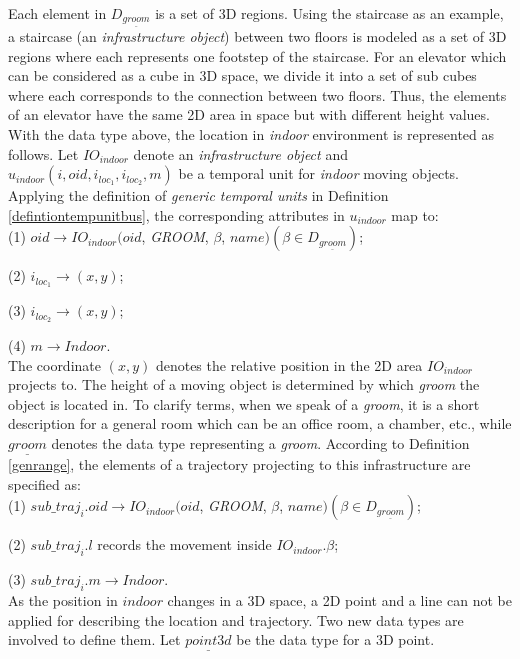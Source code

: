 Each element in $D_{\underline{groom}}$ is a set of 3D regions. 
Using the staircase as an example, a staircase (an \textit{infrastructure object}) between two 
floors is modeled as a set of 3D regions where 
each represents one footstep of the staircase. For an elevator which can be considered as
a cube in 3D space, we divide it into a set of sub cubes where each corresponds to the
connection between two floors. Thus, the elements of an elevator 
have the same 2D area in space but with different height values. \\


With the data type above, the location in \textit{indoor} environment is represented as follows. 
Let $IO_{indoor}$ denote an \textit{infrastructure object} and 
$u_{indoor}(i,oid,i_{loc_1},i_{loc_2}, m)$ be a temporal unit for \textit{indoor} moving objects.  Applying the definition of \textit{generic temporal units} in Definition \ref{defintiontempunitbus}, the corresponding attributes in $u_{indoor}$ map to: \\

(1) $oid \rightarrow IO_{indoor}(oid$, \textit{GROOM}, $\beta$, $name)(\beta \in D_{\underline{groom}})$;  

(2) $i_{loc_1}\rightarrow (x,y)$; 

(3) $i_{loc_2}\rightarrow (x,y)$; 

(4) $m\rightarrow Indoor$. \\

The coordinate $(x,y)$ denotes the relative position in the 2D area $IO_{indoor}$ projects 
to. The height of a moving object is determined by which \textit{groom} the object is located in. To clarify terms, when we speak of a \textit{groom}, it is a short description for a general room which can be an office room, a chamber, etc., while $\underline{groom}$ denotes the data type representing a \textit{groom}. According to Definition \ref{genrange}, the elements of a trajectory projecting to this infrastructure are specified as: \\

(1) $sub\_traj_i.oid \rightarrow IO_{indoor}(oid$, \textit{GROOM}, $\beta$, $name)(\beta \in D_{\underline{groom}})$;

(2) $sub\_traj_i.l$ records the movement inside $IO_{indoor}.\beta$;

(3) $sub\_traj_i.m \rightarrow Indoor$.  \\

As the position in $indoor$ changes in a 3D space, a 2D point and a line can not be applied for describing the location and trajectory. Two new data types are involved to define them. Let $\underline{point3d}$ be the data type for a 3D point. 

